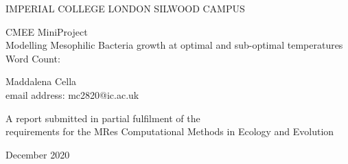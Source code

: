 \documentclass[a4paper]{article}
\newcommand\wordcount{} %
\begin{document}
	\begin{center}
		{\large IMPERIAL COLLEGE LONDON SILWOOD CAMPUS}
	\end{center}
	\vspace{4cm}
	
	\begin{center}
		
		\Huge CMEE MiniProject\\Modelling Mesophilic Bacteria growth at optimal and sub-optimal temperatures\\		
		\vspace{1cm}		
		\large {Word Count: \wordcount}
		
	\end{center}
	\vspace{2cm}
	\begin{center}
		\Large Maddalena Cella\\email address: mc2820@ic.ac.uk
	\end{center}
	
	\vspace{5cm}
	\begin{center}
		{\large A report submitted in partial fulfilment of the \\requirements for the MRes Computational Methods in Ecology and Evolution }
	\end{center}
	
	\begin{center}
		{\large December 2020}
	\end{center}		

	\newpage

\cleardoublepage{}
\end{document}
